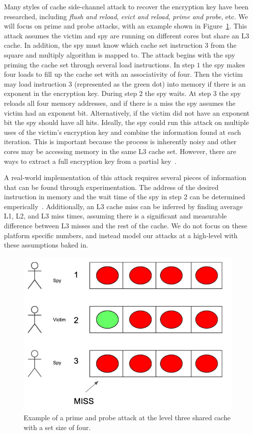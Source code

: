 \documentclass[12pt]{article}
\begin{document}
Many styles of cache side-channel attack to recover the encryption key have been researched, including {\it flush and reload}, {\it evict and reload}, {\it prime and probe}, etc. 
We will focus on prime and probe attacks, with an example shown in Figure~\ref{fig:pp}.
This attack assumes the victim and spy are running on different cores but share an L3 cache.
In addition, the spy must know which cache set instruction $3$ from the square and multiply algorithm is mapped to.
The attack begins with the spy priming the cache set through several load instructions.
In step $1$ the spy makes four loads to fill up the cache set with an associativity of four.
Then the victim may load instruction $3$ (represented as the green dot) into memory if there is an exponent in the encryption key.
During step $2$ the spy waits.
At step $3$ the spy reloads all four memory addresses, and if there is a miss the spy assumes the victim had an exponent bit.
Alternatively, if the victim did not have an exponent bit the spy should have all hits.
Ideally, the spy could run this attack on multiple uses of the victim's encryption key and combine the information found at each iteration.
This is important because the process is inherently noisy and other cores may be accessing memory in the same L3 cache set.
However, there are ways to extract a full encryption key from a partial key~\cite{partKey}.

A real-world implementation of this attack requires several pieces of information that can be found through experimentation.
The address of the desired instruction in memory and the wait time of the spy in step $2$ can be determined emperically~\cite{waitTime}.
Additionally, an L3 cache miss can be inferred by finding average L1, L2, and L3 miss times,
assuming there is a significant and measurable difference between L3 misses and the rest of the cache.
We do not focus on these platform specific numbers, and instead model our attacks at a high-level with these assumptions baked in.

\begin{figure}[t]
\centering
\includegraphics[scale=0.8]{../presentation/cattack.png}
\caption{Example of a prime and probe attack at the level three shared cache with a set size of four.}
\label{fig:pp}
\end{figure}
\end{document}
